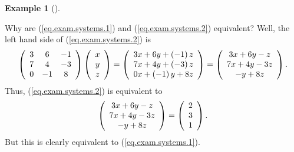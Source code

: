 \documentclass[numbers=enddot,12pt,final,onecolumn,notitlepage]{scrartcl}%
\theoremstyle{definition}
\newtheorem{exam}[theo]{Example}
\newenvironment{example}[1][]
{\begin{exam}[#1]\begin{leftbar}}
{\end{leftbar}\end{exam}}
\begin{document}
\begin{example}
Why are (\ref{eq.exam.systems.1}) and (\ref{eq.exam.systems.2}) equivalent?
Well, the left hand side of (\ref{eq.exam.systems.2}) is%
\[
\left(
\begin{array}
[c]{ccc}%
3 & 6 & -1\\
7 & 4 & -3\\
0 & -1 & 8
\end{array}
\right)  \left(
\begin{array}
[c]{c}%
x\\
y\\
z
\end{array}
\right)  =\left(
\begin{array}
[c]{c}%
3x+6y+\left(  -1\right)  z\\
7x+4y+\left(  -3\right)  z\\
0x+\left(  -1\right)  y+8z
\end{array}
\right)  =\left(
\begin{array}
[c]{c}%
3x+6y-z\\
7x+4y-3z\\
-y+8z
\end{array}
\right)  .
\]
Thus, (\ref{eq.exam.systems.2}) is equivalent to%
\[
\left(
\begin{array}
[c]{c}%
3x+6y-z\\
7x+4y-3z\\
-y+8z
\end{array}
\right)  =\left(
\begin{array}
[c]{c}%
2\\
3\\
1
\end{array}
\right)  .
\]
But this is clearly equivalent to (\ref{eq.exam.systems.1}).
\end{example}
\end{document}

